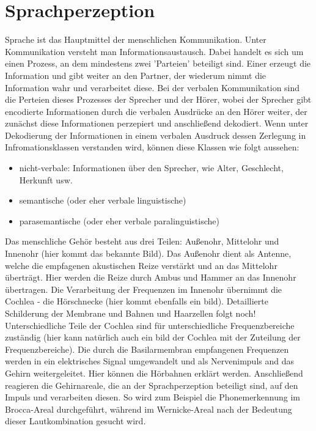 \documentclass[11pt,a4paper,headsepline,twoside,toc=bibliography]{scrreprt}
\begin{document}
\section{Sprachperzeption}
\label{speech_perception}

Sprache ist das Hauptmittel der menschlichen Kommunikation. Unter Kommunikation versteht man Informationsaustausch. Dabei handelt es sich um einen Prozess, an dem mindestens zwei 'Parteien' beteiligt sind. Einer erzeugt die Information und gibt weiter an den Partner, der wiederum nimmt die Information wahr und verarbeitet diese. Bei der verbalen Kommunikation sind die Perteien dieses Prozesses der Sprecher und der Hörer, wobei der Sprecher gibt encodierte Informationen durch die verbalen Ausdrücke an den Hörer weiter, der zunächst diese Informationen perzepiert und anschließend dekodiert. Wenn unter Dekodierung der Informationen in einem verbalen Ausdruck dessen Zerlegung in Infromationsklassen verstanden wird, können diese Klassen wie folgt aussehen:

\begin{itemize}
	\item nicht-verbale: Informationen über den Sprecher, wie Alter, Geschlecht, Herkunft usw.
	\item semantische (oder eher verbale linguistische)
	\item parasemantische (oder eher verbale paralinguistische)
\end{itemize}

Das menschliche Gehör besteht aus drei Teilen: Außenohr, Mittelohr und Innenohr (hier kommt das bekannte Bild). Das Außenohr dient als Antenne, welche die empfagenen akustischen Reize verstärkt und an das Mittelohr überträgt. Hier werden die Reize durch Ambus und Hammer an das Innenohr übertragen. Die Verarbeitung der Frequenzen im Innenohr übernimmt die Cochlea - die Hörschnecke (hier kommt ebenfalls ein bild). Detaillierte Schilderung der Membrane und Bahnen und Haarzellen folgt noch! Unterschiedliche Teile der Cochlea sind für unterschiedliche Frequenzbereiche zuständig (hier kann natürlich auch ein bild der Cochlea mit der Zuteilung der Frequenzbereiche). Die durch die Basilarmembran empfangenen Frequenzen werden in ein elektrisches Signal umgewandelt und als Nervenimpuls and das Gehirn weitergeleitet. Hier können die Hörbahnen erklärt werden. Anschließend reagieren die Gehirnareale, die an der Sprachperzeption beteiligt sind, auf den Impuls und verarbeiten diesen. So wird zum Beispiel die Phonemerkennung im Brocca-Areal durchgeführt, während im Wernicke-Areal nach der Bedeutung dieser Lautkombination gesucht wird. \\
\end{document}
